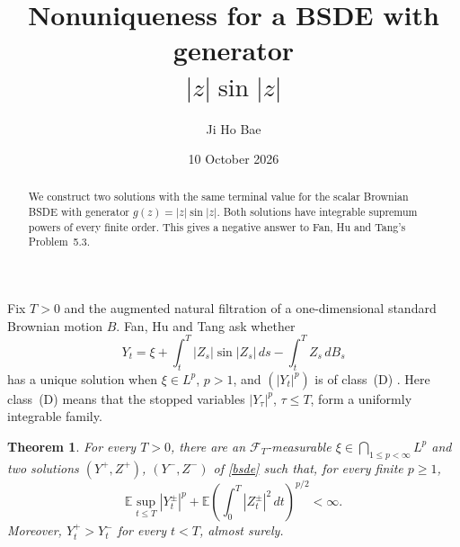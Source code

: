 \documentclass[11pt]{article}
\title{Nonuniqueness for a BSDE with generator\texorpdfstring{\\$|z|\sin|z|$}{ |z| sin |z|}}
\author{Ji Ho Bae}
\date{10 October 2026}
\newcommand{\E}{\mathbb E}
\newtheorem{theorem}{Theorem}
\begin{document}
\maketitle

\begin{abstract}
We construct two solutions with the same terminal value for the scalar
Brownian BSDE with generator $g(z)=|z|\sin|z|$. Both solutions have
integrable supremum powers of every finite order. This gives a negative
answer to Fan, Hu and Tang's Problem~5.3.
\end{abstract}

Fix $T>0$ and the augmented natural filtration of a one-dimensional
standard Brownian motion $B$. Fan, Hu and Tang ask whether
\begin{equation}\label{bsde}
 Y_t=\xi+\int_t^T |Z_s|\sin|Z_s|\,ds-\int_t^T Z_s\,dB_s
\end{equation}
has a unique solution when $\xi\in L^p$, $p>1$, and $(|Y_t|^p)$ is of
class~(D) \cite[Problem~5.3, equation~(5.2)]{FHT}. Here class~(D) means
that the stopped variables $|Y_\tau|^p$, $\tau\le T$, form a uniformly
integrable family.

\begin{theorem}\label{main}
For every $T>0$, there are an $\mathcal F_T$-measurable
$\xi\in\bigcap_{1\le p<\infty}L^p$ and two solutions
$(Y^+,Z^+)$, $(Y^-,Z^-)$ of \eqref{bsde} such that, for every finite
$p\ge1$,
\[
 \E\sup_{t\le T}|Y_t^\pm|^p+
 \E\left(\int_0^T|Z_t^\pm|^2\,dt\right)^{p/2}<\infty.
\]
Moreover, $Y_t^+>Y_t^-$ for every $t<T$, almost surely.
\end{theorem}
\end{document}
